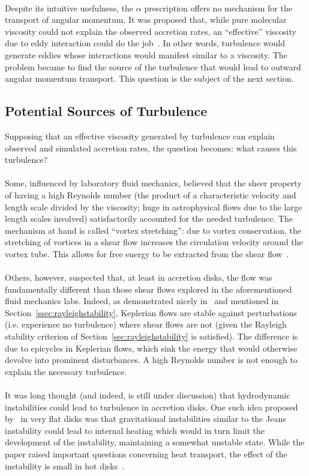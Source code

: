 \\
Despite its intuitive usefulness, the $\alpha$ prescription offers no mechanism for the transport of angular momentum. It was proposed that, while pure molecular viscosity could not explain the observed accretion rates, an ``effective'' viscosity due to eddy interaction could do the job~\cite{BH1998}. In other words, turbulence would generate eddies whose interactions would manifest similar to a viscosity. The problem became to find the source of the turbulence that would lead to outward angular momentum transport. This question is the subject of the next section.

\subsection{Potential Sources of Turbulence}
Supposing that an effective viscosity generated by turbulence can explain observed and simulated accretion rates, the question becomes: what causes this turbulence? \\
\\
Some, influenced by laboratory fluid mechanics, believed that the sheer property of having a high Reynolds number (the product of a characteristic velocity and length scale divided by the viscosity; huge in astrophysical flows due to the large length scales involved) satisfactorily accounted for the needed turbulence. The mechanism at hand is called ``vortex stretching'': due to vortex conservation, the stretching of vortices in a shear flow increases the circulation velocity around the vortex tube. This allows for free energy to be extracted from the shear flow~\cite{BH1998}.\\
\\
Others, however, suspected that, at least in accretion disks, the flow was fundamentally different than those shear flows explored in the aforementioned fluid mechanics labs. Indeed, as demonstrated nicely in~\cite{BH1998:SectionIII.c.1} and mentioned in Section~\ref{ssec:rayleighstability}, Keplerian flows are stable against perturbations (i.e. experience no turbulence) where shear flows are not (given the Rayleigh stability criterion of Section~\ref{sec:rayleighstability} is satisfied). The difference is due to epicycles in Keplerian flows, which sink the energy that would otherwise devolve into prominent disturbances. A high Reynolds number is not enough to explain the necessary turbulence.\\
\\
It was long thought (and indeed, is still under discussion) that hydrodynamic instabilities could lead to turbulence in accretion disks. One such idea proposed by~\citet{Paczynski1978} in very flat disks was that gravitational instabilities similar to the Jeans instability could lead to internal heating which would in turn limit the development of the instability, maintaining a somewhat unstable state. While the paper raised important questions concerning heat transport, the effect of the instability is small in hot disks~\cite{Spruit2009}.\\
